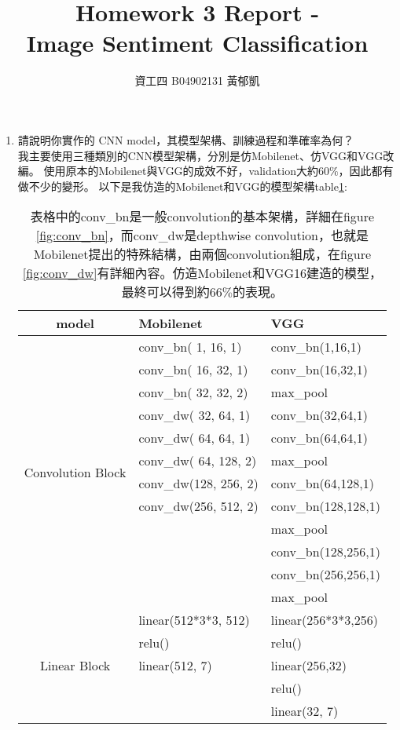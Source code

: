 \documentclass[12pt, a4paper]{article}
\author{資工四 B04902131 黃郁凱}
\title{\vspace{-2cm} Homework 3 Report - \\Image Sentiment Classification}
\begin{document}
\maketitle

\begin{enumerate}
\item 請說明你實作的 CNN model，其模型架構、訓練過程和準確率為何？\\
我主要使用三種類別的CNN模型架構，分別是仿Mobilenet、仿VGG和VGG改編。
使用原本的Mobilenet與VGG的成效不好，validation大約$60\%$，因此都有做不少的變形。
以下是我仿造的Mobilenet和VGG的模型架構table\ref{tab:Mobilenet_VGG}:\\
\begin{table}[h]
\centering
\begin{tabular}{|c|l|l|}\hline
    model&Mobilenet & VGG\\ \hline
    \multirow{12}{*}{Convolution Block}&conv\_bn(  1,  16, 1)&conv\_bn(1,16,1)\\
    &conv\_bn( 16,  32, 1)&conv\_bn(16,32,1)\\
    &conv\_bn( 32,  32, 2)&max\_pool\\
    &conv\_dw( 32,  64, 1)&conv\_bn(32,64,1)\\
    &conv\_dw( 64,  64, 1)&conv\_bn(64,64,1)\\
    &conv\_dw( 64, 128, 2)&max\_pool\\
    &conv\_dw(128, 256, 2)&conv\_bn(64,128,1)\\
    &conv\_dw(256, 512, 2)&conv\_bn(128,128,1)\\ 
    &                     &max\_pool\\
    &                     &conv\_bn(128,256,1)\\
    &                     &conv\_bn(256,256,1)\\
    &                     &max\_pool\\ \hline
    \multirow{5}{*}{Linear Block}&linear(512*3*3, 512)&linear(256*3*3,256)\\
    &relu()&relu()\\
    &linear(512, 7)&linear(256,32)\\
    &&relu()\\
    &&linear(32, 7)\\ \hline
\end{tabular}
\caption{表格中的conv\_bn是一般convolution的基本架構，詳細在figure \ref{fig:conv_bn}，而conv\_dw是depthwise convolution，也就是Mobilenet提出的特殊結構，由兩個convolution組成，在figure \ref{fig:conv_dw}有詳細內容。仿造Mobilenet和VGG16建造的模型，最終可以得到約$66\%$的表現。}
\label{tab:Mobilenet_VGG}
\end{table}


\end{enumerate}
\end{document}
